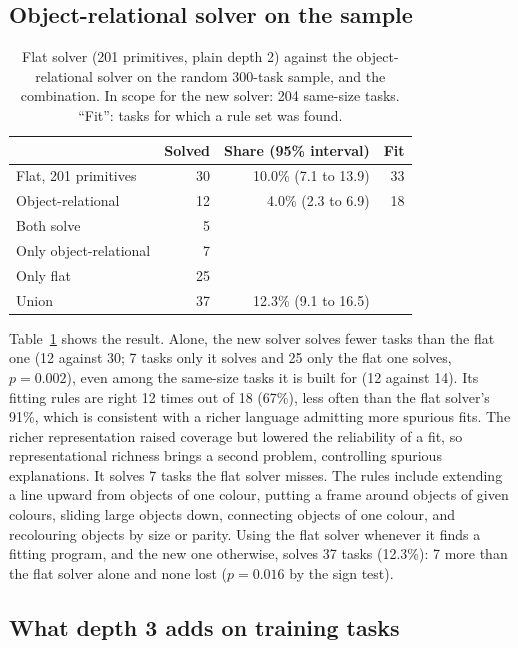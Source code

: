 \documentclass[sigconf,nonacm]{acmart}
\begin{document}
\subsection{Object-relational solver on the sample}

\begin{table}[t]
\caption{Flat solver (201 primitives, plain depth 2) against the object-relational solver on the random 300-task sample, and the combination. In scope for the new solver: 204 same-size tasks. ``Fit'': tasks for which a rule set was found.}
\label{tab:orel}
\footnotesize\setlength{\tabcolsep}{4pt}
\begin{tabular}{@{}lrrr@{}}
\toprule
 & Solved & Share (95\% interval) & Fit \\
\midrule
Flat, 201 primitives & 30 & 10.0\% (7.1 to 13.9) & 33 \\
Object-relational & 12 & 4.0\% (2.3 to 6.9) & 18 \\
Both solve & 5 & & \\
Only object-relational & 7 & & \\
Only flat & 25 & & \\
Union & 37 & 12.3\% (9.1 to 16.5) & \\
\bottomrule
\end{tabular}
\end{table}

Table~\ref{tab:orel} shows the result. Alone, the new solver solves fewer tasks than the flat one (12 against 30; 7 tasks only it solves and 25 only the flat one solves, $p=0.002$), even among the same-size tasks it is built for (12 against 14). Its fitting rules are right 12 times out of 18 (67\%), less often than the flat solver's 91\%, which is consistent with a richer language admitting more spurious fits. The richer representation raised coverage but lowered the reliability of a fit, so representational richness brings a second problem, controlling spurious explanations. It solves 7 tasks the flat solver misses. The rules include extending a line upward from objects of one colour, putting a frame around objects of given colours, sliding large objects down, connecting objects of one colour, and recolouring objects by size or parity. Using the flat solver whenever it finds a fitting program, and the new one otherwise, solves 37 tasks (12.3\%): 7 more than the flat solver alone and none lost ($p=0.016$ by the sign test).



\subsection{What depth 3 adds on training tasks}
\end{document}
